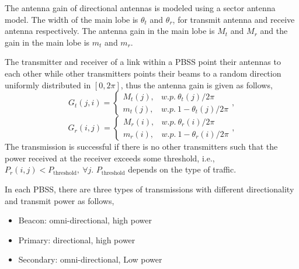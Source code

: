 \documentclass[10pt, conference, letterpaper]{IEEEtran}
\begin{document}
The antenna gain of directional antennas is modeled using a sector antenna model.%
The width of the main lobe is $\theta_t$ and $\theta_r$, for transmit antenna and receive antenna respectively. The antenna gain in the main lobe is $M_t$ and $M_r$ and the gain in the main lobe is $m_t$ and $m_r$.

The transmitter and receiver of a link within a PBSS point their antennas to each other while other transmitters points their beams to a random direction uniformly distributed in $[0, 2\pi]$, thus the antenna gain is given as follows,
\begin{equation*}
G_t(j,i) = 
\begin{cases}
M_t(j), & w.p. ~ \theta_t(j)/2\pi \\
m_t(j), & w.p. ~ 1-\theta_t(j)/2\pi
\end{cases},
\end{equation*}
\begin{equation*}
G_r(i,j) = 
\begin{cases}
M_r(i), & w.p. ~ \theta_r(i)/2\pi \\
m_r(i), & w.p. ~ 1-\theta_r(i)/2\pi
\end{cases},
\end{equation*}
The transmission is successful if there is no other transmitters such that the power received at the receiver exceeds some threshold, i.e., $P_r(i,j)< P_{\mathrm{threshold}}, ~ \forall j$. $P_{\mathrm{threshold}}$ depends on the type of traffic. 

In each PBSS, there are three types of transmissions with different directionality and transmit power as follows,
\begin{itemize}
	\item Beacon: omni-directional, high power
	\item Primary: directional, high power
	\item Secondary: omni-directional, Low power
\end{itemize}


\end{document}
